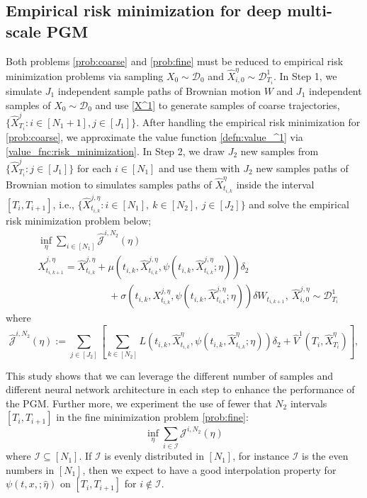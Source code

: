 \documentclass{article}
\numberwithin{equation}{section}
\begin{document}
\subsection{Empirical risk minimization for deep multi-scale PGM}
Both problems \eqref{prob:coarse} and \eqref{prob:fine} must be reduced to empirical risk minimization problems via sampling $X_0\sim\mathcal{D}_0$ and $\hat{X}^\eta_{i,0}\sim\mathcal{D}^1_{T_i}$. In Step 1, we simulate $J_1$ independent sample paths of Brownian motion $W$ and $J_1$  independent samples of $X_0\sim\mathcal{D}_0$ and use \eqref{X^1} to generate samples of coarse trajectories, $\{\hat{X}^j_{T_i}:i\in[N_1+1],j\in[J_1]\}$. After handling the empirical risk minimization for \eqref{prob:coarse}, we approximate the value function \eqref{defn:value_^1} via \eqref{value_fnc:risk_minimization}. In Step 2, we draw $J_2$ new samples from  $\{\hat{X}^j_{T_i}:j\in[J_1]\}$ for each $i\in[N_1]$ and use them with $J_2$ new samples paths of Brownian motion to simulates samples paths of  $\hat{X}^\eta_{t_{i,k}}$ inside the interval $[T_i,T_{i+1}]$, i.e., $\{\hat{X}^{j,\eta}_{t_{i,k}}:i\in[N_1],~k\in[N_2],~j\in[J_2]\}$ and solve the empirical risk minimization problem below;
\begin{align}
    &\inf_{\eta}\sum_{i\in[N_1]}\hat{\mathcal{J}}^{i,N_2}(\eta)\\
   & \hat{X}^{j,\eta}_{t_{i,k+1}}=\hat{X}^{j,\eta}_{t_{i,k}}+\mu({t_{i,k}},\hat{X}^{j,\eta}_{t_{i,k}},\psi(t_{i,k},\hat{X}^{j,\eta}_{t_{i,k}};\eta))\delta_2\nonumber\\
   &\hspace{3cm} +\sigma({t_{i,k}},X^{j,\eta}_{t_{i,k}},\psi(t_{i,k},\hat{X}^{j,\eta}_{t_{i,k}};\eta))\delta W_{{t_{i,k+1}}},~\hat{X}^{j,\eta}_{i,0}\sim\mathcal{D}^1_{T_i}
\end{align}
where 
\begin{equation}
    \hat{\mathcal{J}}^{i,N_2}(\eta):=\sum_{j\in[J_2]}\left[\sum_{k\in[N_2]}L(t_{i,k},\hat{X}^\eta_{t_{i,k}},\psi(t_{i,k},\hat{X}^\eta_{t_{i,k}};\eta))\delta_2 + \hat{V}^1(T_i,\hat{X}^\eta_{T_{i}})\right],
\end{equation}


This study shows that we can leverage the different number of samples and different neural network architecture  in each step to enhance the performance of the PGM.
Further more, we experiment the use of fewer that $N_2$ intervals $[T_{i},T_{i+1}]$ in the fine minimization problem \eqref{prob:fine}:
\begin{equation}\label{prob:fewer_intervals}
    \inf_{\eta}\sum_{i\in\mathcal{I}}\mathcal{J}^{i,N_2}(\eta)
\end{equation}
where $\mathcal{I}\subseteq[N_1]$. If $\mathcal{I}$ is evenly distributed in $[N_1]$, for instance $\mathcal{I}$ is the even numbers in $[N_1]$, then we expect to have a good interpolation property for $\psi(t,x,;\hat{\eta})$ on $[T_{i},T_{i+1}]$ for $i\notin \mathcal{I}$.
\end{document}
